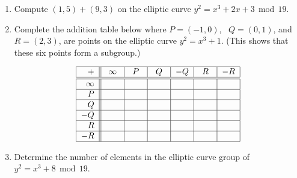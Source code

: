 \documentclass{article}
\renewcommand{\mod}{\,\operatorname{mod}\,}
\begin{document}
\begin{enumerate}
\item Compute $(1,5)+(9,3)$ on the elliptic curve $y^2=x^3+2x+3\mod 19$.

\item Complete the addition table below where $P=(-1,0)$, \ $Q=(0,1)$, and $R=(2,3)$, are points on the elliptic curve $y^2=x^3+1$. (This shows that these six points form a subgroup.)

\[
\begin{tabular}{|r||c|c|c|c|c|c|}
\hline
$+$ & $\infty$ & $P$ & $Q$ & $-Q$ & $R$ & $-R$\\
\hline
\hline
$\infty$ & \phantom{$-Q$} & \phantom{$-Q$} & \phantom{$-Q$} & \phantom{$-Q$} & \phantom{$-Q$} & \\
\hline
$P$ & & & & & & \\
\hline
$Q$ & & & & & & \\
\hline
$-Q$ & & & & &  & \\
\hline
$R$ & & & & & & \\
\hline
$-R$ & & & &  & & \\
\hline
\end{tabular}
\]

\item Determine the number of elements in the elliptic curve group of $y^2=x^3+8\mod 19$.


\end{enumerate}
\end{document}
